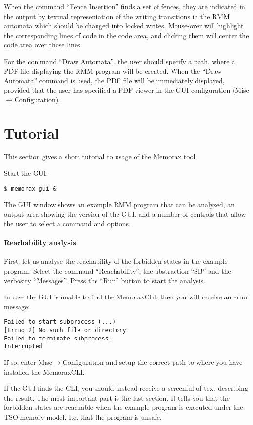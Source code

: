 \documentclass[a4paper]{article}
\newcommand{\tool}{Memorax} %
\newcommand{\thetool}{the Memorax tool} %
\begin{document}
When the command ``Fence Insertion'' finds a set of fences, they are
indicated in the output by textual representation of the writing
transitions in the RMM automata which should be changed into locked
writes. Mouse-over will highlight the corresponding lines of code in
the code area, and clicking them will center the code area over those
lines.

For the command ``Draw Automata'', the user should specify a path,
where a PDF file displaying the RMM program will be created. When the
``Draw Automata'' command is used, the PDF file will be immediately
displayed, provided that the user has specified a PDF viewer in the
GUI configuration (Misc$\rightarrow$Configuration).

\section{Tutorial}

This section gives a short tutorial to usage of \thetool.

Start the GUI.

\noindent
\begin{verbatim}
$ memorax-gui &
\end{verbatim}

The GUI window shows an example RMM program that can be analysed, an
output area showing the version of the GUI, and a number of controls
that allow the user to select a command and options.

\paragraph{Reachability analysis}
First, let us analyse the reachability of the forbidden states in the
example program: Select the command ``Reachability'', the abstraction
``SB'' and the verbosity ``Messages''. Press the ``Run'' button to
start the analysis.

In case the GUI is unable to find the \tool CLI, then you will receive
an error message:

\noindent
\begin{verbatim}
Failed to start subprocess (...)
[Errno 2] No such file or directory
Failed to terminate subprocess.
Interrupted
\end{verbatim}

If so, enter Misc$\rightarrow$Configuration and setup the correct path
to where you have installed the \tool CLI.

If the GUI finds the CLI, you should instead receive a screenful of
text describing the result. The most important part is the last
section. It tells you that the forbidden states are reachable when the
example program is executed under the TSO memory model. I.e. that the
program is unsafe.
\end{document}
